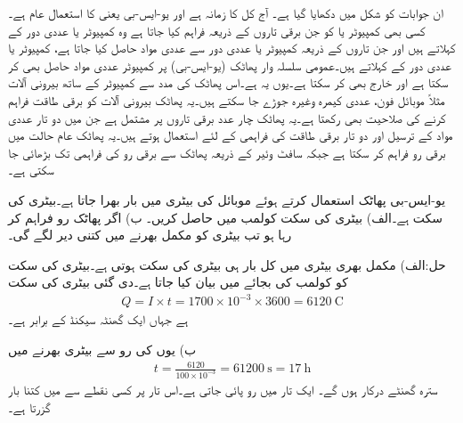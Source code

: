 ان جوابات کو شکل  میں دکھایا گیا ہے۔
آج کل  کا زمانہ ہے اور  یو-ایس-بی یعنی  کا استعمال عام ہے۔کسی بھی کمپیوٹر یا  کو  جن برقی تاروں کے ذریعہ فراہم کیا جاتا ہے وہ کمپیوٹر یا عددی دور کے  کہلاتے ہیں اور جن تاروں کے ذریعہ کمپیوٹر یا عددی دور سے عددی مواد حاصل کیا جاتا ہے، کمپیوٹر یا عددی دور کے   کہلاتے ہیں۔عمومی سلسلہ وار پھاٹک (یو-ایس-بی) پر کمپیوٹر عددی مواد حاصل بھی کر سکتا ہے اور خارج بھی  کر سکتا ہے۔یوں یہ  ہے۔اس پھاٹک کی مدد سے کمپیوٹر کے ساتھ بیرونی آلات مثلاً موبائل فون، عددی کیمرہ وغیرہ جوڑے جا سکتے ہیں۔یہ پھاٹک بیرونی آلات کو برقی طاقت فراہم کرنے کی صلاحیت بھی رکھتا ہے۔یہ پھاٹک چار عدد برقی تاروں پر مشتمل ہے جن میں دو تار عددی مواد کے ترسیل اور دو تار برقی طاقت کی فراہمی کے لئے استعمال ہوتے ہیں۔یہ پھاٹک عام حالت میں  برقی رو فراہم کر سکتا ہے جبکہ سافٹ وئیر کے ذریعہ پھاٹک سے برقی رو کی فراہمی  تک بڑھائی جا سکتی ہے۔

یو-ایس-بی پھاٹک استعمال کرتے ہوئے موبائل کی  بیٹری میں بار بھرا جاتا ہے۔بیٹری کی سکت  ہے۔الف) بیٹری کی سکت کولمب  میں حاصل کریں۔ ب) اگر پھاٹک  رو فراہم کر رہا ہو تب بیٹری کو مکمل بھرنے میں کتنی دیر لگے گی۔ 

حل:الف) مکمل بھری بیٹری میں کل بار ہی بیٹری کی سکت ہوتی ہے۔بیٹری کی سکت کو کولمب  کی بجائے  میں بیان کیا جاتا ہے۔دی گئی بیٹری کی سکت
\begin{align*}
Q=I\times t=1700 \times 10^{-3} \times 3600=\SI{6120}{\coulomb}
\end{align*}
ہے جہاں ایک گھنٹہ   سیکنڈ کے برابر ہے۔ 

ب) یوں  کی رو سے بیٹری بھرنے میں
\begin{align*}
t=\frac{6120}{100\times 10^{-3}}=\SI{61200}{\second} =\SI{17}{\hour}
\end{align*}
سترہ گھنٹے درکار ہوں گے۔
ایک تار میں  رو پائی جاتی ہے۔اس تار پر کسی نقطے سے  میں کتنا بار گزرتا ہے۔

